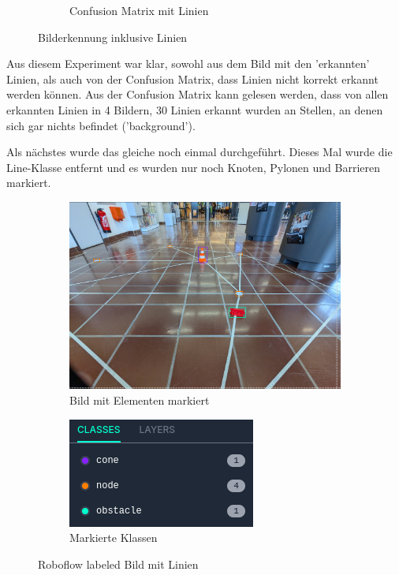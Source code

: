 \begin{figure}[H]
\begin{subfigure}{0.69\textwidth}
\caption{Confusion Matrix mit Linien}
\label{fig:conf-matrix-lines}
\end{subfigure}

\caption{Bilderkennung inklusive Linien}
\label{fig:recognition-with-lines}
\end{figure}

Aus diesem Experiment war klar, sowohl aus dem Bild mit den 'erkannten' Linien, als auch von der Confusion Matrix, dass Linien nicht korrekt erkannt werden können.
Aus der Confusion Matrix kann gelesen werden, dass von allen erkannten Linien in 4 Bildern, 30 Linien erkannt wurden an Stellen, an denen sich gar nichts befindet ('background').

Als nächstes wurde das gleiche noch einmal durchgeführt. Dieses Mal wurde die Line-Klasse entfernt und es wurden nur noch Knoten, Pylonen und Barrieren markiert.

\begin{figure}[H]
\begin{subfigure}{0.55\textwidth}
\includegraphics[width=0.95\linewidth]{assets/informatik-prototyp/yolo/labeled-image.png} 
\caption{Bild mit Elementen markiert}
\label{fig:labeled-image}
\end{subfigure}
\begin{subfigure}{0.4\textwidth}
\includegraphics[width=0.95\linewidth]{assets/informatik-prototyp/yolo/labeled-classes.png} 
\caption{Markierte Klassen}
\label{fig:line-classes}
\end{subfigure}

\caption{Roboflow labeled Bild mit Linien}
\label{fig:labeled-with-lines}
\end{figure}

